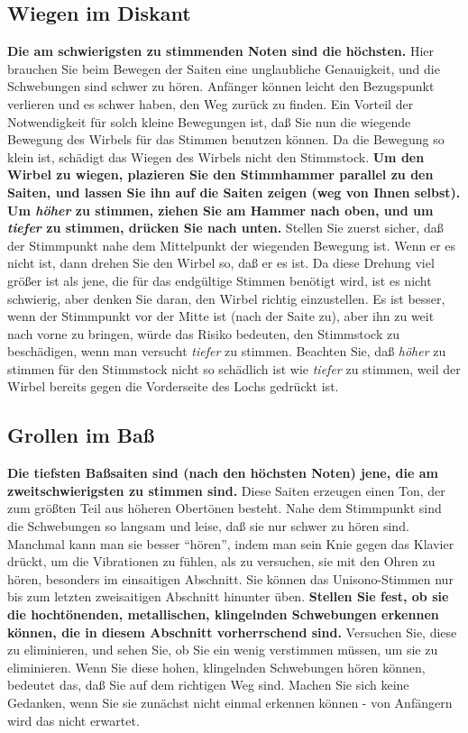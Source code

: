 \subsection{Wiegen im Diskant}\hypertarget{c2_5_disk}{}

\textbf{Die am schwierigsten zu stimmenden Noten sind die höchsten.}
Hier brauchen Sie beim Bewegen der Saiten eine unglaubliche Genauigkeit, und die Schwebungen sind schwer zu hören.
Anfänger können leicht den Bezugspunkt verlieren und es schwer haben, den Weg zurück zu finden.
Ein Vorteil der Notwendigkeit für solch kleine Bewegungen ist, daß Sie nun die wiegende Bewegung des Wirbels für das Stimmen benutzen können.
Da die Bewegung so klein ist, schädigt das Wiegen des Wirbels nicht den Stimmstock.
\textbf{Um den Wirbel zu wiegen, plazieren Sie den Stimmhammer parallel zu den Saiten, und lassen Sie ihn auf die Saiten zeigen (weg von Ihnen selbst).
Um \textit{höher} zu stimmen, ziehen Sie am Hammer nach oben, und um \textit{tiefer} zu stimmen, drücken Sie nach unten.}
Stellen Sie zuerst sicher, daß der Stimmpunkt nahe dem Mittelpunkt der wiegenden Bewegung ist.
Wenn er es nicht ist, dann drehen Sie den Wirbel so, daß er es ist.
Da diese Drehung viel größer ist als jene, die für das endgültige Stimmen benötigt wird, ist es nicht schwierig, aber denken Sie daran, den Wirbel richtig einzustellen.
Es ist besser, wenn der Stimmpunkt vor der Mitte ist (nach der Saite zu), aber ihn zu weit nach vorne zu bringen, würde das Risiko bedeuten, den Stimmstock zu beschädigen, wenn man versucht \textit{tiefer} zu stimmen.
Beachten Sie, daß \textit{höher} zu stimmen für den Stimmstock nicht so schädlich ist wie \textit{tiefer} zu stimmen, weil der Wirbel bereits gegen die Vorderseite des Lochs gedrückt ist.
 

\hypertarget{c2_5i}{}
\subsection{Grollen im Baß}\hypertarget{c2_5_bass}{}

\textbf{Die tiefsten Baßsaiten sind (nach den höchsten Noten) jene, die am zweitschwierigsten zu stimmen sind.}
Diese Saiten erzeugen einen Ton, der zum größten Teil aus höheren Obertönen besteht.
Nahe dem Stimmpunkt sind die Schwebungen so langsam und leise, daß sie nur schwer zu hören sind.
Manchmal kann man sie besser \enquote{hören}, indem man sein Knie gegen das Klavier drückt, um die Vibrationen zu fühlen, als zu versuchen, sie mit den Ohren zu hören, besonders im einsaitigen Abschnitt.
Sie können das Unisono-Stimmen nur bis zum letzten zweisaitigen Abschnitt hinunter üben.
\textbf{Stellen Sie fest, ob sie die hochtönenden, metallischen, klingelnden Schwebungen erkennen können, die in diesem Abschnitt vorherrschend sind.}
Versuchen Sie, diese zu eliminieren, und sehen Sie, ob Sie ein wenig verstimmen müssen, um sie zu eliminieren.
Wenn Sie diese hohen, klingelnden Schwebungen hören können, bedeutet das, daß Sie auf dem richtigen Weg sind.
Machen Sie sich keine Gedanken, wenn Sie sie zunächst nicht einmal erkennen können - von Anfängern wird das nicht erwartet.
 

